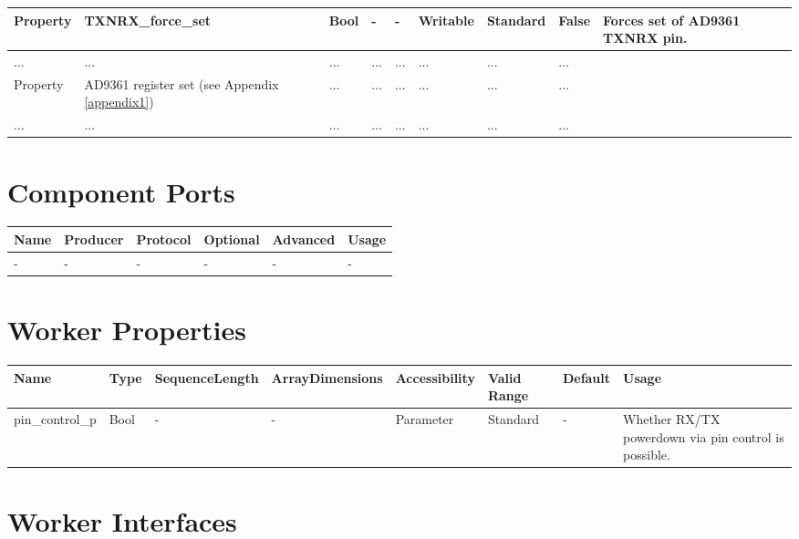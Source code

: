 \documentclass{article}
\begin{document}
\begin{landscape}
\begin{scriptsize}
\begin{longtable}{|p{2cm}|p{5cm}|p{1cm}|p{1.1cm}|p{1.4cm}|p{1.75cm}|p{1.5cm}|p{1.5cm}|p{5.24cm}|}
      \hline
      Property & TXNRX\_force\_set             & Bool & - & - & Writable           & Standard & False & Forces set of AD9361 TXNRX pin. \\
      \hline
      ... & ... & ... & ... & ... & ... & ... & ... \\
      Property & AD9361 register set (see Appendix \ref{appendix1}) & ... & ... & ... & ... & ... & ... \\
      ... & ... & ... & ... & ... & ... & ... & ... \\
      \hline
  \end{longtable}
  \end{scriptsize}

  \section*{Component Ports}
  \begin{scriptsize}
    \begin{tabular}{|p{2cm}|p{1.5cm}|p{4cm}|p{1.5cm}|p{1.5cm}|p{11.29cm}|}
      \hline
      \rowcolor{blue}
      Name & Producer & Protocol           & Optional & Advanced & Usage                  \\
      \hline
      -    & -        & -                  & -        & -        & - \\
      \hline
    \end{tabular}
  \end{scriptsize}

  \section*{Worker Properties}
  \begin{scriptsize}
    \begin{tabular}{|p{3.75cm}|p{1.25cm}|p{2cm}|p{2.75cm}|p{1.5cm}|p{1.5cm}|p{1cm}|p{7.17cm}|}
      \hline
      \rowcolor{blue}
      Name               & Type & SequenceLength & ArrayDimensions & Accessibility      & Valid Range & Default & Usage                                                                               \\
      \hline
      pin\_control\_p & Bool & - & - & Parameter & Standard & - & Whether RX/TX powerdown via pin control is possible. \\
      \hline
    \end{tabular}
  \end{scriptsize}

  \section*{Worker Interfaces}

\end{landscape}
\end{document}
